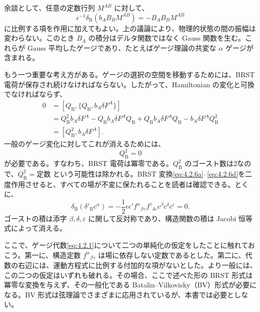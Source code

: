 余談として、任意の定数行列 $M^{AB}$ に対して、
\begin{equation}
\epsilon^{-1}\delta_{\mathrm B}(b_AB_BM^{AB})=-B_AB_BM^{AB}
\tag{4.2.11}\label{eq:4.2.11}
\end{equation}
に比例する項を作用に加えてもよい。上の議論により、物理的状態の間の振幅は変わらない。このとき $B_A$ の積分はデルタ関数ではなく Gauss 関数を生む。これらが Gauss 平均したゲージであり、たとえばゲージ理論の共変な $\alpha$ ゲージが含まれる。

もう一つ重要な考え方がある。ゲージの選択の空間を移動するためには、BRST 電荷が保存され続けなければならない。したがって、Hamiltonian の変化と可換でなければならず、
\begin{equation}
\begin{aligned}
0&=[Q_{\mathrm B},\{Q_{\mathrm B},b_A\delta F^A\}]\\
&=Q_{\mathrm B}^2b_A\delta F^A-Q_{\mathrm B}b_A\delta F^AQ_{\mathrm B}
+Q_{\mathrm B}b_A\delta F^AQ_{\mathrm B}-b_A\delta F^AQ_{\mathrm B}^2\\
&=[Q_{\mathrm B}^2,b_A\delta F^A].
\end{aligned}
\tag{4.2.12}\label{eq:4.2.12}
\end{equation}
一般のゲージ変化に対してこれが消えるためには、
\begin{equation}
Q_{\mathrm B}^2=0
\tag{4.2.13}\label{eq:4.2.13}
\end{equation}
が必要である。すなわち、BRST 電荷は冪零である。$Q_{\mathrm B}^2$ のゴースト数は2なので、$Q_{\mathrm B}^2=\text{定数}$ という可能性は除かれる。BRST 変換\eqref{eq:4.2.6a}--\eqref{eq:4.2.6d}を二度作用させると、すべての場が不変に保たれることを読者は確認できる。とくに、
\begin{equation}
\delta_{\mathrm B}(\delta'_{\mathrm B}c^\alpha)
=-\frac12\epsilon\epsilon'f^\alpha{}_{\beta\gamma}
f^\gamma{}_{\delta\varepsilon}c^\beta c^\delta c^\varepsilon=0.
\tag{4.2.14}\label{eq:4.2.14}
\end{equation}
ゴーストの積は添字 $\beta,\delta,\varepsilon$ に関して反対称であり、構造関数の積は Jacobi 恒等式によって消える。

ここで、ゲージ代数\eqref{eq:4.2.1}について二つの単純化の仮定をしたことに触れておこう。第一に、構造定数 $f^\alpha{}_{\beta\gamma}$ は場に依存しない定数であるとした。第二に、代数の右辺には、運動方程式に比例する付加的な項がないとした。より一般には、この二つの仮定はいずれも破れる。その場合、ここで述べた形の BRST 形式は冪零な変換を与えず、その一般化である Batalin--Vilkovisky（BV）形式が必要になる。BV 形式は弦理論でさまざまに応用されているが、本書では必要としない。

